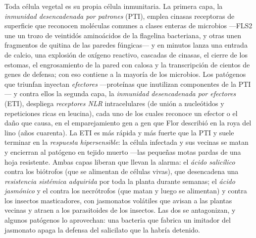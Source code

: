 \begin{definition}\label{def:b3:plant-molecular-physiology:immunity}
Toda célula vegetal es su propia célula inmunitaria. La primera capa,
la \emph{inmunidad desencadenada por patrones} (PTI), emplea cinasas
receptoras de superficie que reconocen moléculas comunes a clases
enteras de microbios ---FLS2 une un trozo de veintidós aminoácidos de
la flagelina bacteriana, y otras unen fragmentos de quitina de las
paredes fúngicas--- y en minutos lanza una entrada de calcio, una
explosión de oxígeno reactivo, cascadas de cinasas, el cierre de los
estomas, el engrosamiento de la pared con calosa y la transcripción de
cientos de genes de defensa; con eso contiene a la mayoría de los
microbios. Los patógenos que triunfan inyectan \emph{efectores}
---proteínas que inutilizan componentes de la PTI--- y contra ellos la
segunda capa, la \emph{inmunidad desencadenada por efectores} (ETI),
despliega \emph{receptores NLR} intracelulares (de unión a nucleótidos
y repeticiones ricas en leucina), cada uno de los cuales reconoce un
efector o el daño que causa, en el emparejamiento gen a gen que Flor
describió en la roya del lino (años cuarenta). La ETI es más rápida y
más fuerte que la PTI y suele terminar en la \emph{respuesta
hipersensible}: la célula infectada y sus vecinas se matan y encierran
al patógeno en tejido muerto ---las pequeñas motas pardas de una hoja
resistente. Ambas capas liberan  que llevan la alarma: el
\emph{ácido salicílico} contra los biótrofos (que se alimentan de
células vivas), que desencadena una \emph{resistencia sistémica
adquirida} por toda la planta durante semanas; el \emph{ácido
jasmónico} y el  contra los necrótrofos (que matan y luego se
alimentan) y contra los insectos masticadores, con jasmonatos volátiles
que avisan a las plantas vecinas y atraen a los parasitoides de los
insectos. Las dos  se antagonizan, y algunos patógenos lo
aprovechan: una bacteria que fabrica un imitador del jasmonato apaga la
defensa del salicilato que la habría detenido.
\end{definition}

